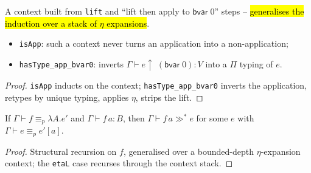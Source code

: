 \begin{lemma}
\label{def:parredext}
\leanok
{}

 A context built from \texttt{lift} and ``lift then apply to
$\mathsf{bvar}\;0$'' steps -- \hl{generalises the induction over a stack of $\eta$ expansions}.
\begin{itemize}
\item \texttt{isApp}: such a context never turns an application into a non-application;
\item \texttt{hasType\_app\_bvar0}: inverts $\Gamma\vdash e{\uparrow}\;(\mathsf{bvar}\;0):V$
      into a $\Pi$ typing of $e$.
\end{itemize}
\end{lemma}
\begin{proof}
\leanok
{} \texttt{isApp} inducts on the context; \texttt{hasType\_app\_bvar0} inverts the
application, retypes by unique typing, applies $\eta$, strips the lift.
\end{proof}

\begin{lemma}
\label{thm:parredext-parred-beta}
\leanok
{}

 If $\Gamma\vdash f\equiv_p\lambda A.e'$ and $\Gamma\vdash f\,a:B$, then
$\Gamma\vdash f\,a\gg^* e$ for some $e$ with $\Gamma\vdash e\equiv_p e'[a]$.
\end{lemma}
\begin{proof}
\leanok
{} Structural recursion on $f$, generalised over a bounded-depth $\eta$-expansion
context; the \texttt{etaL} case recurses through the context stack.
\end{proof}

